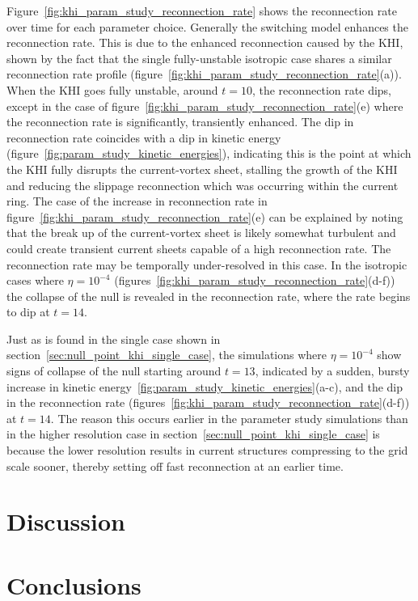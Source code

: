 Figure~\ref{fig:khi_param_study_reconnection_rate} shows the reconnection rate over time for each parameter choice. Generally the switching model enhances the reconnection rate. This is due to the enhanced reconnection caused by the KHI, shown by the fact that the single fully-unstable isotropic case shares a similar reconnection rate profile (figure~\ref{fig:khi_param_study_reconnection_rate}(a)). When the KHI goes fully unstable, around $t=10$, the reconnection rate dips, except in the case of figure~\ref{fig:khi_param_study_reconnection_rate}(e) where the reconnection rate is significantly, transiently enhanced. The dip in reconnection rate coincides with a dip in kinetic energy (figure~\ref{fig:param_study_kinetic_energies}), indicating this is the point at which the KHI fully disrupts the current-vortex sheet, stalling the growth of the KHI and reducing the slippage reconnection which was occurring within the current ring. The case of the increase in reconnection rate in figure~\ref{fig:khi_param_study_reconnection_rate}(e) can be explained by noting that the break up of the current-vortex sheet is likely somewhat turbulent and could create transient current sheets capable of a high reconnection rate. The reconnection rate may be temporally under-resolved in this case. In the isotropic cases where $\eta=10^{-4}$ (figures~\ref{fig:khi_param_study_reconnection_rate}(d-f)) the collapse of the null is revealed in the reconnection rate, where the rate begins to dip at $t=14$.

Just as is found in the single case shown in section~\ref{sec:null_point_khi_single_case}, the simulations where $\eta = 10^{-4}$ show signs of collapse of the null starting around $t=13$, indicated by a sudden, bursty increase in kinetic energy~\ref{fig:param_study_kinetic_energies}(a-c), and the dip in the reconnection rate (figures~\ref{fig:khi_param_study_reconnection_rate}(d-f)) at $t=14$. The reason this occurs earlier in the parameter study simulations than in the higher resolution case in section~\ref{sec:null_point_khi_single_case} is because the lower resolution results in current structures compressing to the grid scale sooner, thereby setting off fast reconnection at an earlier time. 

\section{Discussion}
\label{sec:khi_discussion}

\section{Conclusions}
\label{sec:khi_conclusions}

